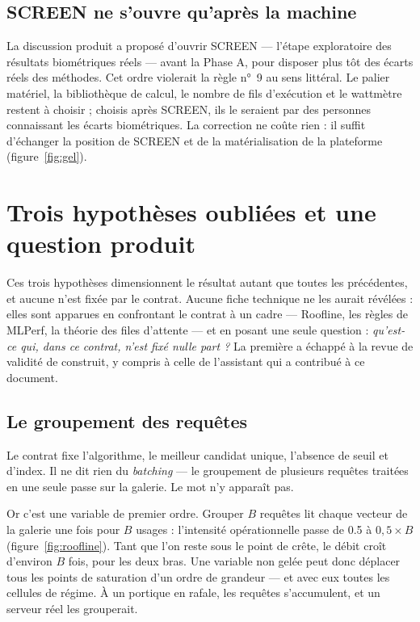 \documentclass[11pt,a4paper]{article}
\newcommand{\terme}[1]{\emph{#1}}
\begin{document}
\subsection{SCREEN ne s'ouvre qu'après la machine}

La discussion produit a proposé d'ouvrir SCREEN — l'étape exploratoire des résultats
biométriques réels — avant la Phase A, pour disposer plus tôt des écarts réels des
méthodes. Cet ordre violerait la règle n°~9 au sens littéral. Le palier matériel, la
bibliothèque de calcul, le nombre de fils d'exécution et le wattmètre restent à choisir ;
choisis après SCREEN, ils le seraient par des personnes connaissant les écarts
biométriques. La correction ne coûte rien : il suffit d'échanger la position de SCREEN
et de la matérialisation de la plateforme (figure~\ref{fig:gel}).

\section{Trois hypothèses oubliées et une question produit}\label{sec:oubliees}

Ces trois hypothèses dimensionnent le résultat autant que toutes les précédentes, et
aucune n'est fixée par le contrat. Aucune fiche technique ne les aurait révélées :
elles sont apparues en confrontant le contrat à un cadre — Roofline, les règles de
MLPerf, la théorie des files d'attente — et en posant une seule question :
\emph{qu'est-ce qui, dans ce contrat, n'est fixé nulle part ?} La première a échappé à
la revue de validité de construit, y compris à celle de l'assistant qui a contribué à
ce document.

\subsection{Le groupement des requêtes}

Le contrat fixe l'algorithme, le meilleur candidat unique, l'absence de seuil et
d'index. Il ne dit rien du \terme{batching} — le groupement de plusieurs requêtes
traitées en une seule passe sur la galerie. Le mot n'y apparaît pas.

Or c'est une variable de premier ordre. Grouper $B$ requêtes lit chaque vecteur de la
galerie une fois pour $B$ usages : l'intensité opérationnelle passe de \num{0,5} à
$0{,}5 \times B$ (figure~\ref{fig:roofline}). Tant que l'on reste sous le point de
crête, le débit croît d'environ $B$ fois, pour les deux bras. Une variable non gelée
peut donc déplacer tous les points de saturation d'un ordre de grandeur — et avec eux
toutes les cellules de régime. À un portique en rafale, les requêtes s'accumulent, et
un serveur réel les grouperait.
\end{document}

